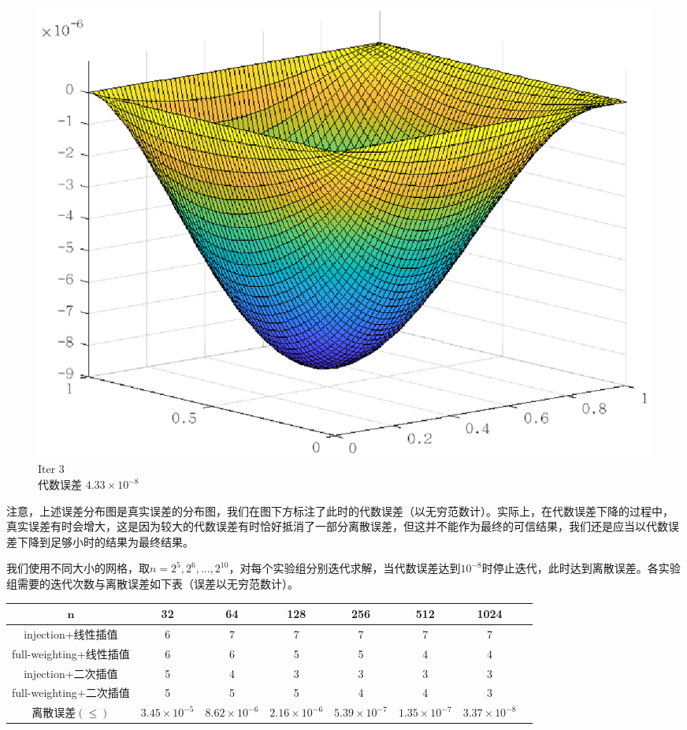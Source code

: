 \documentclass[lang=cn,10pt]{elegantbook}
\begin{document}
\begin{figure}[H]
\begin{minipage}[t]{0.22\linewidth}
    \includegraphics[width=0.84\linewidth]{figure/2-5-13.eps}
    \caption*{\small Iter 3 \\ 代数误差 $4.33\times 10^{-8}$}
  \end{minipage}
\end{figure}

注意，上述误差分布图是真实误差的分布图，我们在图下方标注了此时的代数误差（以无穷范数计）。实际上，在代数误差下降的过程中，真实误差有时会增大，这是因为较大的代数误差有时恰好抵消了一部分离散误差，但这并不能作为最终的可信结果，我们还是应当以代数误差下降到足够小时的结果为最终结果。

我们使用不同大小的网格，取$n=2^5,2^6,...,2^{10}$，对每个实验组分别迭代求解，当代数误差达到$10^{-8}$时停止迭代，此时达到离散误差。各实验组需要的迭代次数与离散误差如下表（误差以无穷范数计）。

\begin{table}[H]
  \centering
  \small
  \begin{tabular}{c|ccccccc}
   $\mathbf{n}$       & 32                   & 64                   & 128                  & 256                  & 512      & 1024           \\ \hline
injection+线性插值   & 6 & 7 & 7 & 7 & 7 &  7 \\
full-weighting+线性插值   & 6 & 6 & 5 & 5 & 4 & 4 \\
injection+二次插值   & 5 & 4 & 3 & 3 & 3 & 3 \\
full-weighting+二次插值   & 5 & 5 & 5 & 4 & 4 & 3 \\
离散误差$(\leq)$   & $3.45\times 10^{-5}$ & $8.62\times 10^{-6}$ & $2.16\times 10^{-6}$ & $5.39\times 10^{-7}$ & $1.35\times 10^{-7}$ & $3.37\times 10^{-8}$
\end{tabular}
\end{table}
\end{document}
